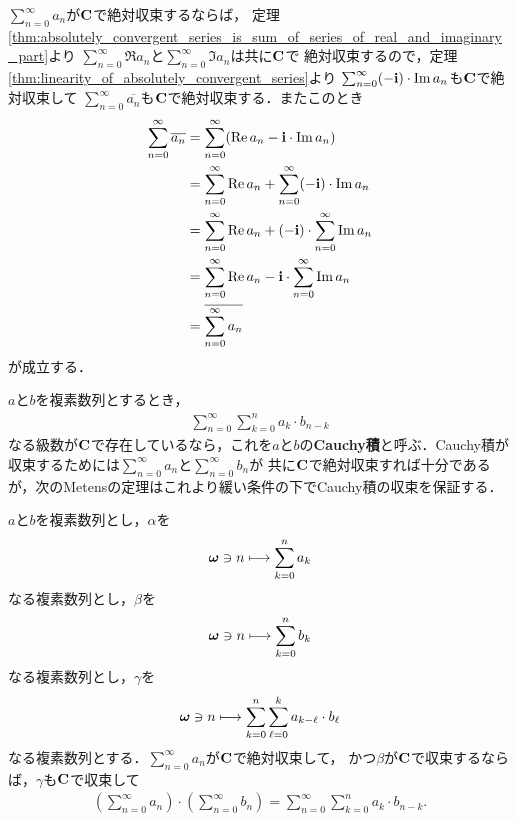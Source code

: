 	\begin{sketch}
		$\sum_{n=0}^\infty a_n$が$\mathbf{C}$で絶対収束するならば，
		定理\ref{thm:absolutely_convergent_series_is_sum_of_series_of_real_and_imaginary_part}より
		$\sum_{n=0}^\infty \Re{a_n}$と$\sum_{n=0}^\infty \Im{a_n}$は共に$\mathbf{C}$で
		絶対収束するので，定理\ref{thm:linearity_of_absolutely_convergent_series}より
		$\sum_{n=0}^\infty (- \mathbf{i}) \cdot \operatorname{Im} a_n$も$\mathbf{C}$で絶対収束して
		$\sum_{n=0}^\infty \overline{a_n}$も$\mathbf{C}$で絶対収束する．またこのとき
		\begin{align}
			\sum_{n=0}^\infty \overline{a_n}
			&= \sum_{n=0}^\infty (\operatorname{Re} a_n - \mathbf{i} \cdot \operatorname{Im} a_n) \\
			&= \sum_{n=0}^\infty \operatorname{Re} a_n + \sum_{n=0}^\infty (-\mathbf{i}) \cdot \operatorname{Im} a_n \\
			&= \sum_{n=0}^\infty \operatorname{Re} a_n + (-\mathbf{i}) \cdot \sum_{n=0}^\infty \operatorname{Im} a_n \\
			&= \sum_{n=0}^\infty \operatorname{Re} a_n - \mathbf{i} \cdot \sum_{n=0}^\infty \operatorname{Im} a_n \\
			&= \overline{\sum_{n=0}^\infty a_n}
		\end{align}
		が成立する．
		\QED
	\end{sketch}
	
	$a$と$b$を複素数列とするとき，
	\begin{align}
		\sum_{n=0}^\infty \sum_{k=0}^n a_k \cdot b_{n-k}
	\end{align}
	なる級数が$\mathbf{C}$で存在しているなら，これを$a$と$b$の{\bf Cauchy積}と呼ぶ．Cauchy積が収束するためには$\sum_{n=0}^\infty a_n$と$\sum_{n=0}^\infty b_n$が
	共に$\mathbf{C}$で絶対収束すれば十分であるが，次のMetensの定理はこれより緩い条件の下でCauchy積の収束を保証する．
	
	\begin{screen}
		\begin{thm}[一方が絶対収束していればCauchy積も収束する]\label{thm:convolution_of_absolutely_convergent_series}
			$a$と$b$を複素数列とし，$\alpha$を
			\begin{align}
				{\boldsymbol \omega} \ni n \longmapsto \sum_{k=0}^n a_k
			\end{align}
			なる複素数列とし，$\beta$を
			\begin{align}
				{\boldsymbol \omega} \ni n \longmapsto \sum_{k=0}^n b_k
			\end{align}
			なる複素数列とし，$\gamma$を
			\begin{align}
				{\boldsymbol \omega} \ni n \longmapsto \sum_{k=0}^n \sum_{\ell = 0}^k a_{k-\ell} \cdot b_\ell
			\end{align}
			なる複素数列とする．$\sum_{n=0}^\infty a_n$が$\mathbf{C}$で絶対収束して，
			かつ$\beta$が$\mathbf{C}$で収束するならば，$\gamma$も$\mathbf{C}$で収束して
			\begin{align}
				\left(\sum_{n=0}^\infty a_n\right) \cdot \left(\sum_{n=0}^\infty b_n\right)
				= \sum_{n=0}^\infty \sum_{k=0}^n a_k \cdot b_{n-k}.
			\end{align}
		\end{thm}
	\end{screen}
	
